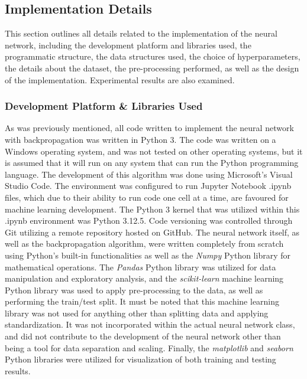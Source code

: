 \documentclass[a4paper]{article}
\begin{document}
\subsection{Implementation Details}

This section outlines all details related to the implementation of the neural network, including the development platform and libraries used, the programmatic structure, the data structures used, the choice of hyperparameters, the details about the dataset, the pre-processing performed, as well as the design of the implementation. Experimental results are also examined. 

\subsubsection{Development Platform \& Libraries Used}

As was previously mentioned, all code written to implement the neural network with backpropagation was written in Python 3. The code was written on a Windows operating system, and was not tested on other operating systems, but it is assumed that it will run on any system that can run the Python programming language. The development of this algorithm was done using Microsoft's Visual Studio Code. The environment was configured to run Jupyter Notebook .ipynb files, which due to their ability to run code one cell at a time, are favoured for machine learning development. The Python 3 kernel that was utilized within this .ipynb environment was Python 3.12.5. Code versioning was controlled through Git utilizing a remote repository hosted on GitHub. The neural network itself, as well as the backpropagation algorithm, were written completely from scratch using Python's built-in functionalities as well as the \textit{Numpy} Python library for mathematical operations. The \textit{Pandas} Python library was utilized for data manipulation and exploratory analysis, and the \textit{scikit-learn} machine learning Python library was used to apply pre-processing to the data, as well as performing the train/test split. It must be noted that this machine learning library was not used for anything other than splitting data and applying standardization. It was not incorporated within the actual neural network class, and did not contribute to the development of the neural network other than being a tool for data separation and scaling. Finally, the \textit{matplotlib} and \textit{seaborn} Python libraries were utilized for visualization of both training and testing results. 
\end{document}

